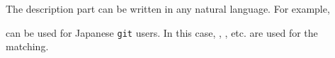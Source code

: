 \documentclass[manuscript,anonymous,review]{acmart}
\def\GIT{\texttt{git}}
\begin{document}
The description part can be written in any natural language.
For example,

\begin{quote}
\end{quote}
can be used for Japanese {\GIT} users.
In this case,
,
, etc.
are used for the matching.

\end{document}

